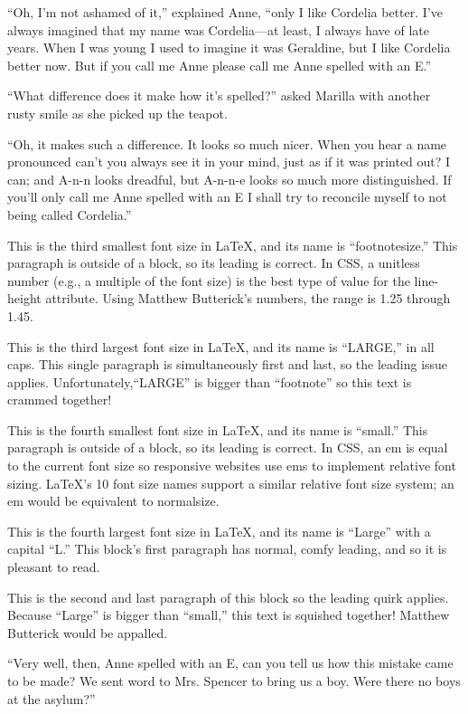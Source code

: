 \documentclass[a4paper]{article}
\begin{document}
{\scriptsize ``Oh, I'm not ashamed of it,'' explained Anne, ``only I like Cordelia better. I've always imagined that my name was Cordelia---at least, I always have of late years. When I was young I used to imagine it was Geraldine, but I like Cordelia better now. But if you call me Anne please call me Anne spelled with an E.''

``What difference does it make how it's spelled?'' asked Marilla with another rusty smile as she picked up the teapot.

``Oh, it makes such a difference. It looks so much nicer. When you hear a name pronounced can't you always see it in your mind, just as if it was printed out? I can; and A-n-n looks dreadful, but A-n-n-e looks so much more distinguished. If you'll only call me Anne spelled with an E I shall try to reconcile myself to not being called Cordelia.''}

\footnotesize This is the third smallest font size in \LaTeX, and its name is ``footnotesize.'' This paragraph is outside of a block, so its leading is correct. In CSS, a unitless number (e.g., a multiple of the font size) is the best type of value for the line-height attribute.  Using Matthew Butterick's numbers, the range is 1.25 through 1.45.

{\LARGE This is the third largest font size in \LaTeX, and its name is ``LARGE,'' in all caps. This single paragraph is simultaneously first and last, so the leading issue applies. Unfortunately,``LARGE'' is bigger than ``footnote''  so this text is crammed together!}

\small This is the fourth smallest font size in \LaTeX, and its name is ``small.'' This paragraph is outside of a block, so its leading is correct. In CSS, an em is equal to the current font size so responsive websites use ems to implement relative font sizing. \LaTeX's 10 font size names support a similar relative font size system; an em would be equivalent to normalsize.

{\Large This is the fourth largest font size in \LaTeX, and its name is ``Large'' with a capital ``L.'' This block's first paragraph has normal, comfy leading, and so it is pleasant to read.

This is the second and last paragraph of this block so the leading quirk applies. Because ``Large'' is bigger than ``small,'' this text is squished together! Matthew Butterick would be appalled.}

\footnotesize``Very well, then, Anne spelled with an E, can you tell us how this mistake came to be made? We sent word to Mrs. Spencer to bring us a boy. Were there no boys at the asylum?''
\end{document}
